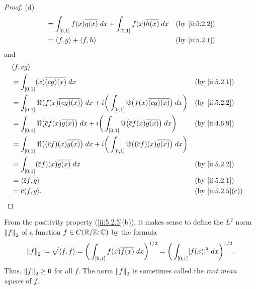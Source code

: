 \begin{proof}{(d)}
\begin{align*}
     & = \int_{[0, 1]} f(x) \overline{g(x)} \; dx + \int_{[0, 1]} f(x) \overline{h(x)} \; dx                                               &                                                      & \by{ii:5.2.2} \\
     & = \inner*{f, g} + \inner*{f, h}                                                                                                     &                                                      & \by{ii:5.2.1}
  \end{align*}
  and
  \begin{align*}
     & \inner*{f, cg}                                                                                                                                                                    \\
     & = \int_{[0, 1]} (x) \overline{(cg)(x)} \; dx                                                                                                                &  & \by{ii:5.2.1}    \\
     & = \int_{[0, 1]} \Re\big(f(x) \overline{(cg)(x)}\big) \; dx + i \bigg(\int_{[0, 1]} \Im\big(f(x) \overline{(cg)(x)}\big) \; dx\bigg)                         &  & \by{ii:5.2.2}    \\
     & = \int_{[0, 1]} \Re\big(\overline{c} f(x) \overline{g(x)}\big) \; dx + i \bigg(\int_{[0, 1]} \Im\big(\overline{c} f(x) \overline{g(x)}\big) \; dx\bigg)     &  & \by{ii:4.6.9}    \\
     & = \int_{[0, 1]} \Re\big((\overline{c} f)(x) \overline{g(x)}\big) \; dx + i \bigg(\int_{[0, 1]} \Im\big((\overline{c} f)(x) \overline{g(x)}\big) \; dx\bigg)                       \\
     & = \int_{[0, 1]} (\overline{c} f)(x) \overline{g(x)} \; dx                                                                                                   &  & \by{ii:5.2.2}    \\
     & = \inner*{\overline{c} f, g}                                                                                                                                &  & \by{ii:5.2.1}    \\
     & = \overline{c} \inner*{f, g}.                                                                                                                               &  & \by{ii:5.2.5}[c]
  \end{align*}
\end{proof}

\begin{ac}\label{ii:ac:5.2.1}
  From the positivity property (\cref{ii:5.2.5}(b)), it makes sense to define the \(L^2\) norm \(\norm*{f}_2\) of a function \(f \in C(\R / \Z ; \C)\) by the formula
  \[
    \norm*{f}_2 \coloneqq \sqrt{\inner*{f, f}} = \bigg(\int_{[0, 1]} f(x) \overline{f(x)} \; dx\bigg)^{1 / 2} = \bigg(\int_{[0, 1]} \abs{f(x)}^2 \; dx\bigg)^{1 / 2}.
  \]
  Thus, \(\norm*{f}_2 \geq 0\) for all \(f\).
  The norm \(\norm*{f}_2\) is sometimes called the \emph{root mean square} of \(f\).
\end{ac}

